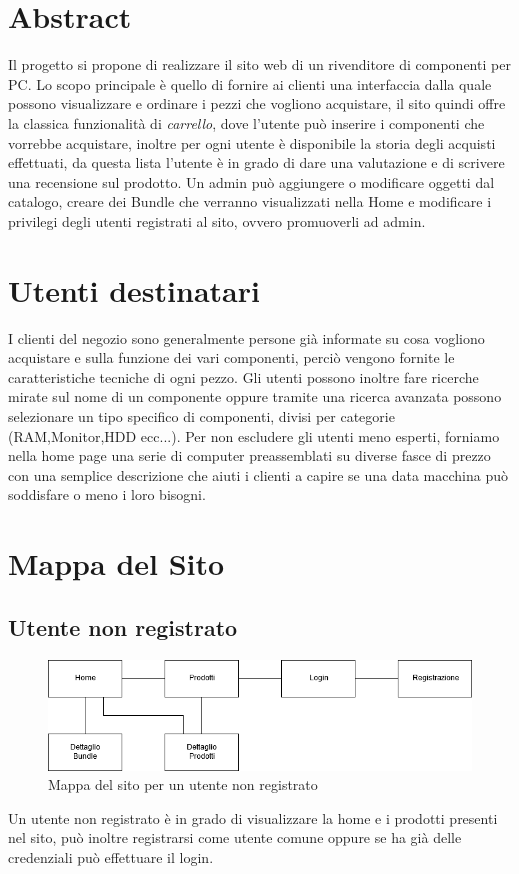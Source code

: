 \section{Abstract}
Il progetto si propone di realizzare il sito web di un rivenditore di componenti per PC.
Lo scopo principale è quello di fornire ai clienti una interfaccia dalla quale possono visualizzare e ordinare i pezzi che vogliono acquistare, il sito quindi offre la classica funzionalità di \emph{carrello}, dove l'utente può inserire i componenti che vorrebbe acquistare, inoltre per ogni utente è disponibile la storia degli acquisti effettuati, da questa lista l'utente è in grado di dare una valutazione e di scrivere una recensione sul prodotto.
Un admin può aggiungere o modificare oggetti dal catalogo, creare dei Bundle che verranno visualizzati nella Home e modificare i privilegi degli utenti registrati al sito, ovvero promuoverli ad admin.

\section{Utenti destinatari}
I clienti del negozio sono generalmente persone già informate su cosa vogliono acquistare e sulla funzione dei vari componenti, perciò vengono fornite le caratteristiche tecniche di ogni pezzo.\newline
 Gli utenti possono inoltre fare ricerche mirate sul nome di un componente oppure tramite una ricerca avanzata possono selezionare un tipo specifico di componenti, divisi per categorie (RAM,Monitor,HDD ecc...).
Per non escludere gli utenti meno esperti, forniamo nella home page una serie di computer preassemblati su diverse fasce di prezzo con una semplice descrizione che aiuti i clienti a capire se una data macchina può soddisfare o meno i loro bisogni.
\newpage
\section{Mappa del Sito}
\subsection{Utente non registrato}
\begin{figure}[h]
	\label{UNR} 
	\centering 
	\includegraphics[width=1\textwidth]{immagini/UNR.png}
	\caption{Mappa del sito per un utente non registrato} 
\end{figure}
Un utente non registrato è in grado di visualizzare la home e i prodotti presenti nel sito, può inoltre registrarsi come utente comune oppure se ha già delle credenziali può effettuare il login.

